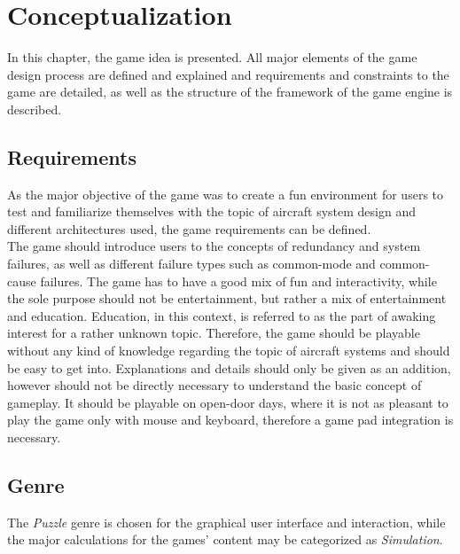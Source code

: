 
\chapter{Conceptualization}\label{ch:design}
In this chapter, the game idea is presented.
All major elements of the game design process are defined and explained and requirements and constraints to the game are detailed, as well as
the structure of the framework of the game engine is described.

\section{Requirements}\label{sec:requirements}
As the major objective of the game was to create a fun environment for users to test and familiarize themselves with the topic of
aircraft system design and different architectures used, the game requirements can be defined.
\\
The game should introduce users to the concepts of redundancy and system failures, as well as different failure types such
as common-mode and common-cause failures.
The game has to have a good mix of fun and interactivity, while the sole purpose should not be entertainment, but rather a
mix of entertainment and education.
Education, in this context, is referred to as the part of awaking interest for a rather unknown topic.
Therefore, the game should be playable without any kind of knowledge regarding the topic of aircraft systems and should be easy
to get into.
Explanations and details should only be given as an addition, however should not be directly necessary to understand the basic concept
of gameplay.
It should be playable on open-door days, where it is not as pleasant to play the game only with mouse and keyboard, therefore a game pad
integration is necessary.

\section{Genre}\label{sec:genre}
The \textit{Puzzle} genre is chosen for the graphical user interface and interaction, while the major calculations for the
games' content may be categorized as \textit{Simulation}.

